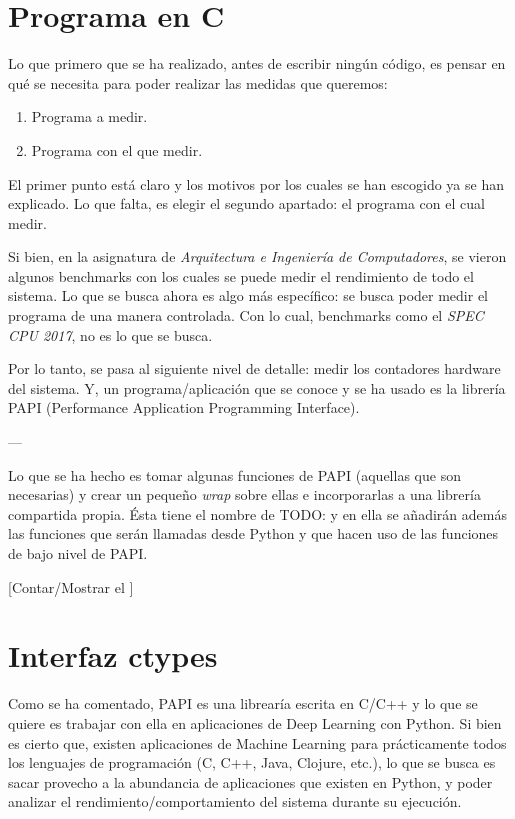 

\section{Programa en C}
Lo que primero que se ha realizado, antes de escribir ningún código, es pensar en qué se necesita para poder realizar las medidas que queremos:

\begin{enumerate}
    \item Programa a medir.
    \item Programa con el que medir.
\end{enumerate}

El primer punto está claro y los motivos por los cuales se han escogido ya se han explicado. Lo que falta, es elegir el segundo apartado: el programa con el cual medir.

Si bien, en la asignatura de \textit{Arquitectura e Ingeniería de Computadores}, se vieron algunos benchmarks con los cuales se puede medir el rendimiento de todo el sistema. Lo que se busca ahora es algo más específico: se busca poder medir el programa de una manera controlada. Con lo cual, benchmarks como el \textit{SPEC CPU 2017}, no es lo que se busca.

Por lo tanto, se pasa al siguiente nivel de detalle: medir los contadores hardware del sistema. Y, un programa/aplicación que se conoce y se ha usado es la librería PAPI (Performance Application Programming Interface).

---

Lo que se ha hecho es tomar algunas funciones de PAPI (aquellas que son necesarias) y crear un pequeño \textit{wrap} sobre ellas e incorporarlas a una librería compartida propia. Ésta tiene el nombre de TODO: y en ella se añadirán además las funciones que serán llamadas desde Python y que hacen uso de las funciones de bajo nivel de PAPI.

[Contar/Mostrar el ]


\section{Interfaz ctypes}

Como se ha comentado, PAPI es una librearía escrita en C/C++ y lo que se quiere es trabajar con ella en aplicaciones de Deep Learning con Python.
Si bien es cierto que, existen aplicaciones de Machine Learning para prácticamente todos los lenguajes de programación (C, C++, Java, Clojure, etc.), lo que se busca es sacar provecho a la abundancia de aplicaciones que existen en Python, y poder analizar el rendimiento/comportamiento del sistema durante su ejecución.

